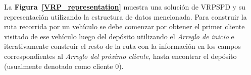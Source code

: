
La \textbf{Figura~\ref{VRP_representation}} muestra una solución de VRPSPD y su representación utilizando la estructura de datos men\-cio\-na\-da. Para construir la ruta recorrida por un vehículo se debe comenzar por obtener el primer cliente visitado de ese vehículo luego del depósito utilizando el \emph{Arreglo de inicio} e iterativamente construir el resto de la ruta con la información en los campos correspondientes al \emph{Arreglo del próximo cliente}, hasta encontrar el depósito (usualmente denotado como cliente 0). 


